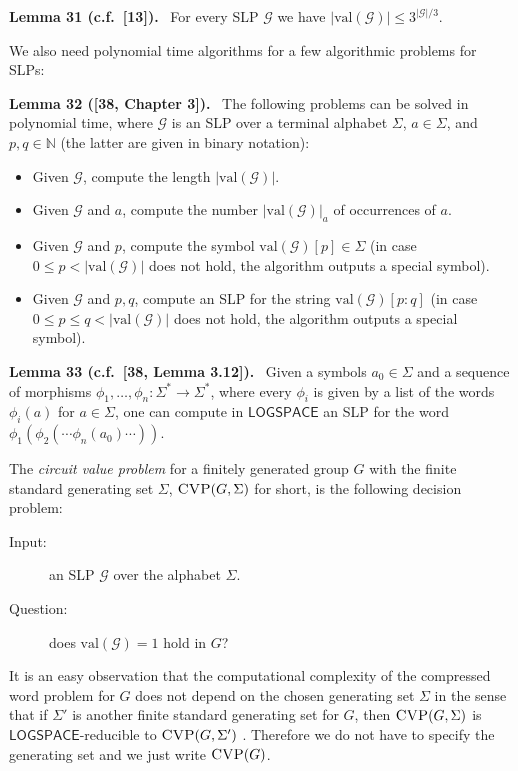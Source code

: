\documentclass[10pt,a4paper]{article}
\newenvironment{authorclaim}[1]{\par\medskip\noindent\textbf{#1.}\ \ignorespaces}{\par\medskip}
\newcommand{\val}{\mathrm{val}}
\newcommand{\CVP}{\textsc{CVP}\xspace}
\renewcommand{\L}{\ensuremath{\mathsf{LOGSPACE}}\xspace}
\begin{document}
\begin{authorclaim}{Lemma 31 (c.f.\ [13])} \label{lemma-SLP-upper-bound}
For every SLP $\mathcal{G}$ we have $|\val(\mathcal{G})| \leq  3^{|\mathcal{G}|/3}$.
\end{authorclaim}
We also need polynomial time algorithms for a few algorithmic problems for SLPs:

\begin{authorclaim}{Lemma 32 ([38, Chapter 3])} \label{lemma-basic}
The following problems can be solved in polynomial time, where $\mathcal{G}$ is an SLP over a terminal alphabet $\Sigma$, $a \in \Sigma$, and $p, q \in \mathbb{N}$
(the latter are given in binary notation):
\begin{itemize}
\item Given $\mathcal{G}$, compute the length $|\val(\mathcal{G})|$.
\item Given $\mathcal{G}$ and $a$, compute the number $|\val(\mathcal{G})|_a$ of occurrences of $a$.
\item Given $\mathcal{G}$ and $p$, compute the symbol $\val(\mathcal{G})[p] \in \Sigma$ (in case $0 \le p < |\val(\mathcal{G})|$ does not hold, the algorithm outputs a special symbol).
\item Given $\mathcal{G}$ and $p,q$, compute an SLP for the string $\val(\mathcal{G})[p:q]$ (in case $0 \le p \leq q < |\val(\mathcal{G})|$ does not hold, the algorithm
outputs a special symbol).
\end{itemize}
\end{authorclaim}

\begin{authorclaim}{Lemma 33 (c.f.\ [38, Lemma 3.12])}  \label{lemma-SLP-iterated-morph}
Given a symbols $a_0 \in \Sigma$ and a sequence of morphisms $\phi_1, \ldots, \phi_n : \Sigma^* \to \Sigma^*$, where every $\phi_i$ is given by a list of the words
$\phi_i(a)$ for $a \in \Sigma$, one can compute in \L an SLP for the word
$\phi_1(\phi_2( \cdots \phi_n(a_0) \cdots))$.
\end{authorclaim}
The {\em circuit value problem} for a finitely generated group $G$ with the finite standard generating set $\Sigma$, $\CVP(G,\Sigma)$ for short,
is the following decision problem:
\begin{description}
\item[Input:]  an SLP $\mathcal{G}$ over the alphabet $\Sigma$.
\item [Question:] does $\val(\mathcal{G})=1$ hold in $G$?
\end{description}
It is an easy observation that the computational complexity of the compressed word 
problem for $G$ does not depend on the chosen generating set $\Sigma$ in the sense
that if $\Sigma'$ is another finite standard generating set for $G$, then $\CVP(G,\Sigma)$
is \L-reducible to $\CVP(G,\Sigma')$ \cite[Lemma~4.2]{ref38}. Therefore we do not
have to specify the generating set and we just write $\CVP(G)$.
\end{document}
